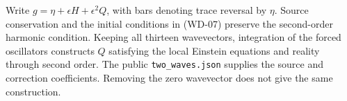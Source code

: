 Write $g=\eta+\epsilon H+\epsilon^2Q$, with bars denoting trace reversal by $\eta$. Source conservation and the initial conditions in (WD-07) preserve the second-order harmonic condition. Keeping all thirteen wavevectors, integration of the forced oscillators constructs $Q$ satisfying the local Einstein equations and reality through second order. The public \texttt{two\_waves.json} supplies the source and correction coefficients. Removing the zero wavevector does not give the same construction.
